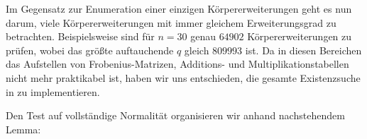 Im Gegensatz zur Enumeration einer einzigen Körpererweiterungen geht es nun
darum, viele Körpererweiterungen mit immer gleichem Erweiterungsgrad zu
betrachten. Beispielsweise sind für $n = 30$ genau
$64902$ Körpererweiterungen zu prüfen, wobei das größte auftauchende $q$
gleich $809993$ ist.
Da in diesen Bereichen das Aufstellen von Frobenius-Matrizen, Additions- und
Multiplikationstabellen nicht mehr praktikabel ist, haben wir uns entschieden,
die gesamte Existenzsuche in \sage zu implementieren.


Den Test auf vollständige Normalität organisieren wir anhand nachstehendem
Lemma: 

